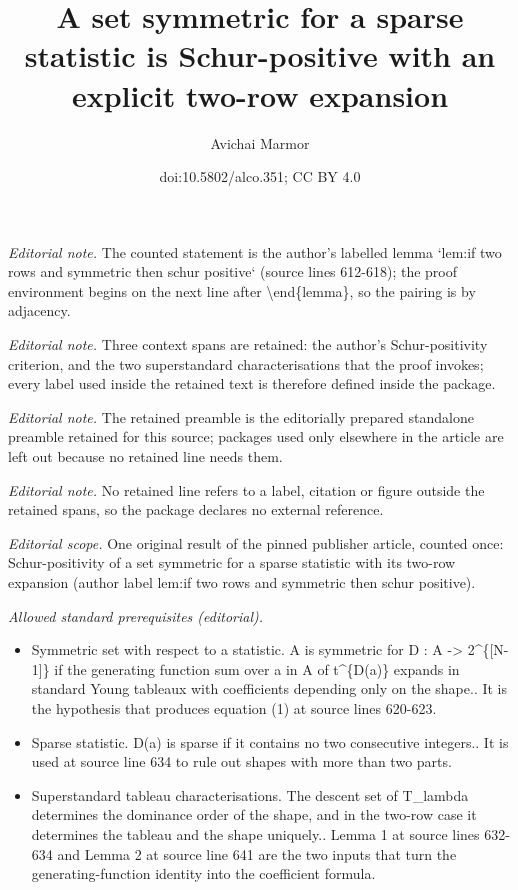 \documentclass[11pt]{article}
\title{A set symmetric for a sparse statistic is Schur-positive with an explicit two-row expansion}
\author{Avichai Marmor}
\date{doi:10.5802/alco.351; CC BY 4.0}
\theoremstyle{definition}
\numberwithin{equation}{section}
\begin{document}
\maketitle
\noindent\textit{Editorial note.} The counted statement is the author's labelled lemma `lem:if two rows and symmetric then schur positive` (source lines 612-618); the proof environment begins on the next line after \textbackslash{}end\{lemma\}, so the pairing is by adjacency.\par\medskip
\noindent\textit{Editorial note.} Three context spans are retained: the author's Schur-positivity criterion, and the two superstandard characterisations that the proof invokes; every label used inside the retained text is therefore defined inside the package.\par\medskip
\noindent\textit{Editorial note.} The retained preamble is the editorially prepared standalone preamble retained for this source; packages used only elsewhere in the article are left out because no retained line needs them.\par\medskip
\noindent\textit{Editorial note.} No retained line refers to a label, citation or figure outside the retained spans, so the package declares no external reference.\par\medskip
\noindent\textit{Editorial scope.} One original result of the pinned publisher article, counted once: Schur-positivity of a set symmetric for a sparse statistic with its two-row expansion (author label lem:if two rows and symmetric then schur positive).\par\medskip
\noindent\textit{Allowed standard prerequisites (editorial).}\begin{itemize}
\item Symmetric set with respect to a statistic. A is symmetric for D : A -> 2\textasciicircum{}\{[N-1]\} if the generating function sum over a in A of t\textasciicircum{}\{D(a)\} expands in standard Young tableaux with coefficients depending only on the shape.. It is the hypothesis that produces equation (1) at source lines 620-623.
\item Sparse statistic. D(a) is sparse if it contains no two consecutive integers.. It is used at source line 634 to rule out shapes with more than two parts.
\item Superstandard tableau characterisations. The descent set of T\_lambda determines the dominance order of the shape, and in the two-row case it determines the tableau and the shape uniquely.. Lemma 1 at source lines 632-634 and Lemma 2 at source line 641 are the two inputs that turn the generating-function identity into the coefficient formula.
\end{itemize}\medskip
\end{document}
